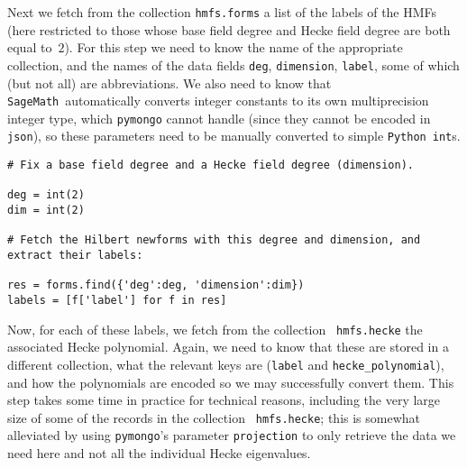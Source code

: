 \documentclass{llncs}
\def\Sage{{\tt SageMath}}
\def\Python{{\tt Python}}
\begin{document}
Next we fetch from the collection {\tt hmfs.forms} a list of the
labels of the HMFs (here restricted to those whose base field degree
and Hecke field degree are both equal to~$2$).  For this step we need
to know the name of the appropriate collection, and the names of the
data fields {\tt deg}, {\tt dimension}, {\tt label}, some of which
(but not all) are abbreviations.  We also need to know that
\Sage\ automatically converts integer constants to its own
multiprecision integer type, which {\tt pymongo} cannot handle (since
they cannot be encoded in {\tt json}), so these parameters need to be
manually converted to simple \Python\ {\tt int}s.
\begin{verbatim}
# Fix a base field degree and a Hecke field degree (dimension).

deg = int(2)
dim = int(2)

# Fetch the Hilbert newforms with this degree and dimension, and extract their labels:

res = forms.find({'deg':deg, 'dimension':dim})
labels = [f['label'] for f in res]

\end{verbatim}

Now, for each of these labels, we fetch from the collection {\tt
  hmfs.hecke} the associated Hecke polynomial.  Again, we need to know
that these are stored in a different collection, what the relevant
keys are ({\tt label} and {\tt hecke\_polynomial}), and how the
polynomials are encoded so we may successfully convert them.  This
step takes some time in practice for technical reasons, including the
very large size of some of the records in the collection {\tt
  hmfs.hecke}; this is somewhat alleviated by using {\tt pymongo}'s
parameter {\tt projection} to only retrieve the data we need here and
not all the individual Hecke eigenvalues.
\end{document}
